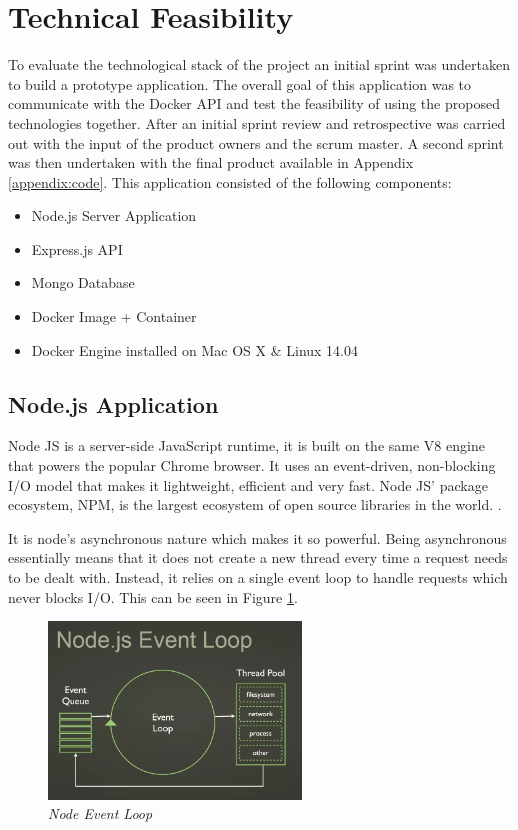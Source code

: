 \section{Technical Feasibility}
\label{sec:feasibility}
To evaluate the technological stack of the project an initial sprint was undertaken to build a prototype application. The overall goal of this application was to communicate with the Docker API and test the feasibility of using the proposed technologies together. After an initial sprint review and retrospective was carried out with the input of the product owners and the scrum master. A second sprint was then undertaken with the final product available in Appendix \ref{appendix:code}. This application consisted of the following components:

\begin{itemize}
  \item Node.js Server Application
  \item Express.js API
	\item Mongo Database
  \item Docker Image + Container
  \item Docker Engine installed on Mac OS X \& Linux 14.04 
\end{itemize}

\subsection{Node.js Application}
\label{sub:nodejs}
Node JS is a server-side JavaScript runtime, it is built on the same V8 engine that powers the popular Chrome browser. It uses an event-driven, non-blocking I/O model that makes it lightweight, efficient and very fast. Node JS' package ecosystem, NPM, is the largest ecosystem of open source libraries in the world. \citep{Nodejs.org2016}.

It is node's asynchronous nature which makes it so powerful. Being asynchronous essentially means that it does not create a new thread every time a request needs to be dealt with. Instead, it relies on a single event loop to handle requests which never blocks I/O. This can be seen in Figure \ref{fig:event_loop}.

\begin{figure}[!ht]
\centering
\includegraphics*[width=0.6\textwidth]{images/event_loop}
\caption{\em Node Event Loop}
\label{fig:event_loop}
\end{figure}

